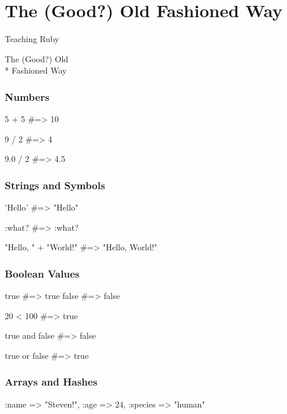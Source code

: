 \documentclass[20pt,aspectratio=169]{beamer}
\begin{document}
\section{The (Good?) Old Fashioned Way}
{
\begin{frame}
\par { Teaching Ruby}\par
\vspace{3cm}\hfill
{The (Good?) Old\\* \hfill Fashioned Way}
\end{frame}
}

\begin{frame}[fragile]
\frametitle{Numbers}
\begin{rubycode}
5 + 5 #=> 10

9 / 2 #=> 4

9.0 / 2 #=> 4.5
\end{rubycode}
\end{frame}

\begin{frame}[fragile]
\frametitle{Strings and Symbols}
\begin{rubycode}
'Hello' #=> "Hello"

:what?  #=> :what?

"Hello, " + "World!"
#=> "Hello, World!"
\end{rubycode}
\end{frame}

\begin{frame}[fragile]
\frametitle{Boolean Values}
\begin{rubycode}
true #=> true
false #=> false

20 < 100 #=> true

true and false #=> false

true or false #=> true
\end{rubycode}
\end{frame}

\begin{frame}[fragile]
\frametitle{Arrays and Hashes}
\begin{rubycode}
[ 1, 2, 3.0, "four" ]

{ :name => "Steven!",
:age => 24,
:species => "human" }
\end{rubycode}
\end{frame}
\end{document}

